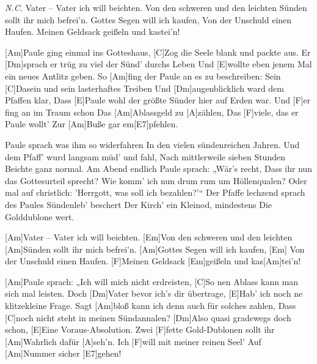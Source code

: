

\begin{guitar}
	\begin{highlightbar}
		 {\footnotesize\textit{N.C.}}
		Vater – Vater ich will beichten.
		Von den schweren und den leichten Sünden sollt ihr mich befrei'n.
		Gottes Segen will ich kaufen,
		Von der Unschuld einen Haufen. Meinen Geldsack geißeln und kastei'n!
	\end{highlightbar}
	
	\songsection{Strophe 1}
	[Am]Paule ging einmal ins Gotteshaus,
	[C]Zog die Seele blank und packte aus.
	Er [Dm]sprach er trüg zu viel der Sünd' durchs Leben
	Und [E]wollte eben jenem Mal ein neues Antlitz geben.
	So [Am]fing der Paule an es zu beschreiben:
	Sein [C]Dasein und sein lasterhaftes Treiben
	Und [Dm]augenblicklich ward dem Pfaffen klar,
	Dass [E]Paule wohl der größte Sünder hier auf Erden war.
	Und [F]er fing an im Traum schon
	Das [Am]Ablassgeld zu [A]zählen,
	Das [F]viele, das er Paule wollt'
	Zur [Am]Buße gar em[E7]pfehlen.
	
	\songsection{Strophe 2}
	Paule sprach was ihm so widerfahren
	In den vielen sündenreichen Jahren.
	Und dem Pfaff' wurd langsam müd' und fahl,
	Nach mittlerweile sieben Stunden Beichte ganz normal.
	Am Abend endlich Paule sprach: „Wär's recht,
	Dass ihr nun das Gottesurteil sprecht?
	Wie komm' ich nun drum rum um Höllenqualen?
	Oder mal auf christlich: 'Herrgott, was soll ich bezahlen?'“
	Der Pfaffe lechzend sprach des Paules 
	Sündenleb' beschert
	Der Kirch' ein Kleinod, mindestens
	Die Golddublone wert.
	
	\begin{highlightbar}
		\songsection{Refrain}
		[Am]Vater – Vater ich will beichten.
		[Em]Von den schweren und den leichten [Am]Sünden sollt ihr mich befrei'n. 
		[Am]Gottes Segen will ich kaufen,
		[Em] Von der Unschuld einen Haufen. [F]Meinen Geldsack [Em]geißeln und kas[Am]tei'n!
	\end{highlightbar}
	
	[Am]Paule sprach: „Ich will mich nicht erdreisten,
	[C]So nen Ablass kann man sich mal leisten.
	Doch [Dm]Vater bevor ich's dir übertrage,
	[E]Hab' ich noch ne klitzekleine Frage.
	Sagt [Am]bloß kann ich denn auch für solches zahlen,
	Dass [C]noch nicht steht in meinen Sündannalen?
	[Dm]Also quasi gradewegs doch schon,
	[E]Eine Voraus-Absolution.
	Zwei [F]fette Gold-Dublonen sollt ihr 
	[Am]Wahrlich dafür [A]seh'n.
	Ich [F]will mit meiner reinen Seel'
	Auf [Am]Nummer sicher [E7]gehen!
	

\end{guitar}

